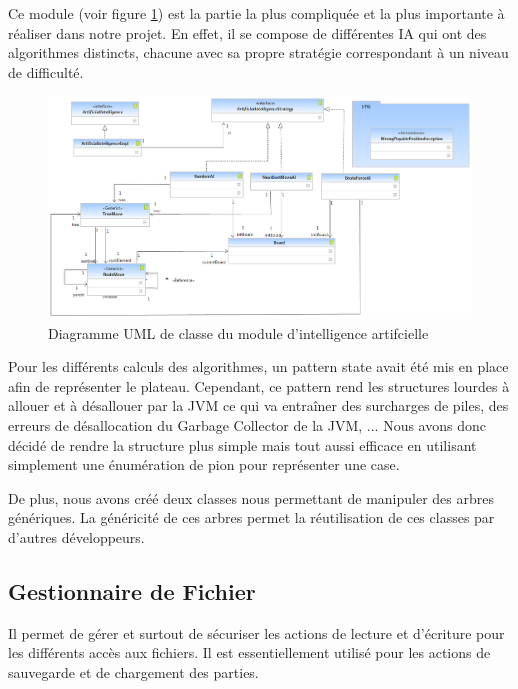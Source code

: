 Ce module (voir figure \ref{ia}) est la partie la plus compliquée et la plus importante à réaliser dans notre projet. En effet, il se compose de différentes IA qui ont des algorithmes distincts, chacune avec sa propre stratégie correspondant à un niveau de difficulté.


\begin{figure}[H]
\centering
\includegraphics[scale=0.48]{Architecture/ArtificialIntelligenceLight.png}
\caption{Diagramme UML de classe du module d'intelligence artifcielle}
\label{ia}
\end{figure}

Pour les différents calculs des algorithmes, un pattern state avait été mis en place afin de représenter le plateau. Cependant, ce pattern rend les structures lourdes à allouer et à désallouer par la JVM ce qui va entraîner des surcharges de piles, des erreurs de désallocation du Garbage Collector de la JVM, ... Nous avons donc décidé de rendre la structure plus simple mais tout aussi efficace en utilisant simplement une énumération de pion pour représenter une case.

De plus, nous avons créé deux classes nous permettant de manipuler des arbres génériques. La généricité de ces arbres permet la réutilisation de ces classes par d'autres développeurs.

\subsection{Gestionnaire de Fichier}

Il permet de gérer et surtout de sécuriser les actions de lecture et d'écriture pour les différents accès aux fichiers. Il est essentiellement utilisé pour les actions de sauvegarde et de chargement des parties.



